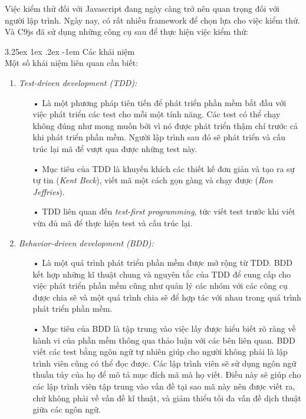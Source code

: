 \documentclass[12pt,a4paper,twoside]{article}
\makeatletter
\let\newcounter\@gobble\let\setcounter\@gobbletwo
\newcommand{\myparagraph}[1]{\paragraph{#1}\mbox{}\\} %
\newcounter{subsubsubsection}[subsubsection]
\renewcommand\paragraph{\@startsection{paragraph}{5}{\z@}%
  {3.25ex \@plus1ex \@minus.2ex}%
  {-1em}%
  {\normalfont\normalsize\bfseries}}
\makeatother
\begin{document}
Việc kiểm thử đối với Javascript đang ngày càng trở nên quan trọng đối với người lập trình. Ngày nay, có rất nhiều framework để chọn lựa cho việc kiểm thử. Và C9js đã sử dụng những công cụ sau để thực hiện việc kiểm thử:

\myparagraph{Các khái niệm}
Một số khái niệm liên quan cần biết:
\begin{enumerate}
\item \emph{Test-driven development (TDD)\cite{tdd_1}:}
\begin{itemize}
\item[•] Là một phương pháp tiên tiến để phát triển phần mềm bắt đầu với việc phát triển các test cho mỗi một tính năng. Các test có thể chạy không đúng như mong muốn bởi vì nó được phát triển thậm chí trước cả khi phát triển phần mềm. Người lập trình sau đó sẽ phát triển và cấu trúc lại mã để vượt qua được những test này. 
\item[•] Mục tiêu của TDD là khuyến khích các thiết kế đơn giản và tạo ra sự tự tin (\textit{Kent Beck}), viết mã một cách gọn gàng và chạy được (\textit{Ron Jeffries}).
\item[•] TDD liên quan đến \textit{test-first programming}, tức viết test trước khi viết vừa đủ mã để thực hiện test và cấu trúc lại.
\end{itemize}

\item \emph{Behavior-driven development (BDD)\cite{bdd_1}:}
\begin{itemize}
\item[•] Là một quá trình phát triển phần mềm được mở rộng từ TDD. BDD kết hợp những kĩ thuật chung và nguyên tắc của TDD để cung cấp cho việc phát triển phần mềm cũng như quản lý các nhóm với các công cụ được chia sẽ và một quá trình chia sẽ để hợp tác với nhau trong quá trình phát triển phần mềm.
\item[•] Mục tiêu của BDD là tập trung vào việc lấy được hiểu biết rõ ràng về hành vi của phần mềm thông qua thảo luận với các bên liên quan. BDD viết các test bằng ngôn ngữ tự nhiên giúp cho người không phải là lập trình viên cũng có thể đọc được. Các lập trình viên sẽ sử dụng ngôn ngữ thuần túy của họ để mô tả mục đích mã mà họ viết. Điều này sẽ giúp cho các lập trình viên tập trung vào vấn đề tại sao mã này nên được viết ra, chứ không phải về vấn đề kĩ thuật, và giảm thiểu tối đa vấn đề dịch thuật giữa các ngôn ngữ.
\end{itemize}
\end{enumerate}
\end{document}
